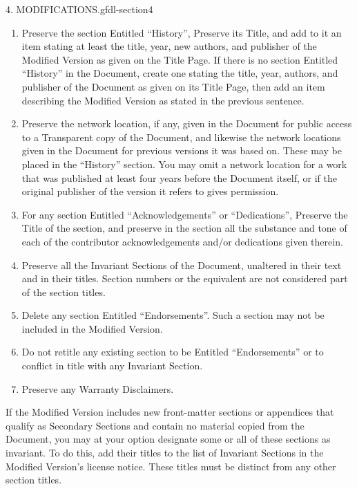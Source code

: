 \documentclass[10pt,]{book}
\numberwithin{equation}{section}
\begin{document}
\begin{paragraphs}{4. MODIFICATIONS.}{gfdl-section4}
\begin{enumerate}[label=\Alph*.]
\item\hypertarget{li-155}{}\hypertarget{p-1555}{}%
Preserve the section Entitled ``History'', Preserve its Title, and add to it an item stating at least the title, year, new authors, and publisher of the Modified Version as given on the Title Page. If there is no section Entitled ``History'' in the Document, create one stating the title, year, authors, and publisher of the Document as given on its Title Page, then add an item describing the Modified Version as stated in the previous sentence.%
\item\hypertarget{li-156}{}\hypertarget{p-1556}{}%
Preserve the network location, if any, given in the Document for public access to a Transparent copy of the Document, and likewise the network locations given in the Document for previous versions it was based on.  These may be placed in the ``History'' section. You may omit a network location for a work that was published at least four years before the Document itself, or if the original publisher of the version it refers to gives permission.%
\item\hypertarget{li-157}{}\hypertarget{p-1557}{}%
For any section Entitled ``Acknowledgements'' or ``Dedications'', Preserve the Title of the section, and preserve in the section all the substance and tone of each of the contributor acknowledgements and/or dedications given therein.%
\item\hypertarget{li-158}{}\hypertarget{p-1558}{}%
Preserve all the Invariant Sections of the Document, unaltered in their text and in their titles. Section numbers or the equivalent are not considered part of the section titles.%
\item\hypertarget{li-159}{}\hypertarget{p-1559}{}%
Delete any section Entitled ``Endorsements''. Such a section may not be included in the Modified Version.%
\item\hypertarget{li-160}{}\hypertarget{p-1560}{}%
Do not retitle any existing section to be Entitled ``Endorsements'' or to conflict in title with any Invariant Section.%
\item\hypertarget{li-161}{}\hypertarget{p-1561}{}%
Preserve any Warranty Disclaimers.%
\end{enumerate}
\hypertarget{p-1562}{}%
If the Modified Version includes new front-matter sections or appendices that qualify as Secondary Sections and contain no material copied from the Document, you may at your option designate some or all of these sections as invariant. To do this, add their titles to the list of Invariant Sections in the Modified Version's license notice. These titles must be distinct from any other section titles.%

\end{paragraphs}
\end{document}
